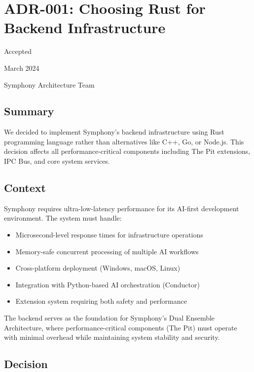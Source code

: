 \section*{ADR-001: Choosing Rust for Backend Infrastructure}

\begin{description}[leftmargin=3cm,labelwidth=2.5cm]
\item[\textbf{Status}] Accepted
\item[\textbf{Date}] March 2024
\item[\textbf{Authors}] Symphony Architecture Team
\end{description}

\subsection*{Summary}

We decided to implement Symphony's backend infrastructure using Rust programming language rather than alternatives like C++, Go, or Node.js. This decision affects all performance-critical components including The Pit extensions, IPC Bus, and core system services.

\subsection*{Context}

Symphony requires ultra-low-latency performance for its AI-first development environment. The system must handle:

\begin{itemize}
\item Microsecond-level response times for infrastructure operations
\item Memory-safe concurrent processing of multiple AI workflows
\item Cross-platform deployment (Windows, macOS, Linux)
\item Integration with Python-based AI orchestration (Conductor)
\item Extension system requiring both safety and performance
\end{itemize}

The backend serves as the foundation for Symphony's Dual Ensemble Architecture, where performance-critical components (The Pit) must operate with minimal overhead while maintaining system stability and security.

\subsection*{Decision}

